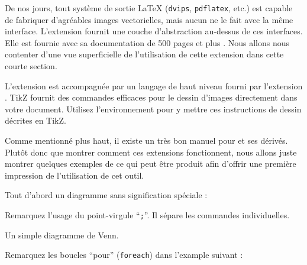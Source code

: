 De nos jours, tout système de sortie \LaTeX{} (\texttt{dvips},
\texttt{pdflatex}, etc.) est
capable de fabriquer d'agréables images vectorielles, mais aucun ne le fait
avec la même interface. L'extension  fournit
une couche d'abstraction au-dessus de ces interfaces.
Elle est fournie avec sa documentation
de 500 pages et plus \cite{pgfplot}. Nous allons nous contenter d'une
vue superficielle de l'utilisation de cette extension dans cette
courte section.

L'extension  est accompagnée par un langage de haut niveau fourni par
l'extension . TikZ fournit des commandes
efficaces pour le dessin d'images directement dans votre
document. Utilisez l'environnement  pour y mettre ces
instructions de dessin décrites en TikZ.

Comme mentionné plus haut, il existe un très bon manuel pour  et
ses dérivés. Plutôt donc que montrer comment ces extensions
fonctionnent, nous allons juste montrer quelques exemples de ce qui
peut être produit afin d'offrir une première impression de
l'utilisation de cet outil.

Tout d'abord un diagramme sans signification spéciale :
\begin{example}
\end{example}
Remarquez l'usage du point-virgule \enquote{\texttt{;}}. Il sépare les
commandes individuelles.

Un simple diagramme de Venn.
\begin{example}
\end{example}

Remarquez les boucles \enquote{pour} (\texttt{foreach}) dans l'example suivant :
\begin{example}
\end{example}

